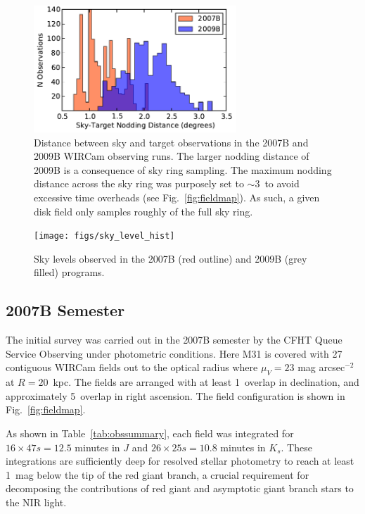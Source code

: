 \documentclass[iop]{emulateapj}
\newcommand{\Fig}[1]{Fig.~\ref{fig:#1}}  %
\begin{document}
\begin{figure}[t]
\centering
\includegraphics[width=3in]{figs/sky_target_dist}
\caption{Distance between sky and target observations in the 2007B and 2009B WIRCam observing runs.
The larger nodding distance of 2009B is a consequence of sky ring sampling.
The maximum nodding distance across the sky ring was purposely set to $\sim 3$\arcdeg\ to avoid excessive time overheads (see \Fig{fieldmap}).
As such, a given disk field only samples roughly of the full sky ring.}
\label{fig:sky_target_dist}
\end{figure}

\begin{figure}[t]
\centering
\texttt{[image: figs/sky\_level\_hist]}
\caption{Sky levels observed in the 2007B (red outline) and 2009B (grey filled) programs.}
\label{fig:net_sky_level}
\end{figure}

\subsection{2007B Semester}
\label{sec:obs7}

The initial survey was carried out in the 2007B semester by the CFHT Queue Service Observing under photometric conditions.
Here M31 is covered with 27 contiguous WIRCam fields out to the optical radius where $\mu_V=23$ mag arcsec$^{-2}$ at $R=20$~kpc.
The fields are arranged with at least 1\arcmin\ overlap in declination, and approximately 5\arcmin\ overlap in right ascension.
The field configuration is shown in \Fig{fieldmap}.

As shown in Table~\ref{tab:obssummary}, each field was integrated for $16\times 47 s = 12.5$ minutes in $J$ and $26\times 25 s = 10.8$ minutes in $K_s$.
These integrations are sufficiently deep for resolved stellar photometry to reach at least 1~mag below the tip of the red giant branch, a crucial requirement for decomposing the contributions of red giant and asymptotic giant branch stars to the NIR light.
\end{document}
